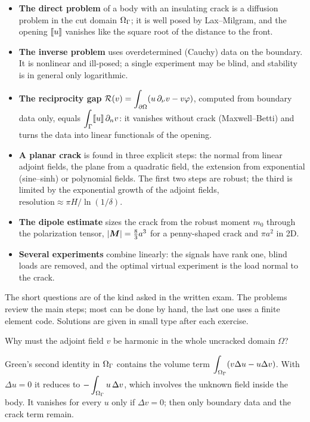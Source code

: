\begin{gbox*}
\begin{itemize}
  \item \textbf{The direct problem} of a body with an insulating crack is a
  diffusion problem in the cut domain $\Omega_\Gamma$; it is well posed by
  Lax--Milgram, and the opening $[\![u]\!]$ vanishes like the square root of the
  distance to the front.
  \item \textbf{The inverse problem} uses overdetermined (Cauchy) data on the
  boundary. It is nonlinear and ill-posed; a single experiment may be blind,
  and stability is in general only logarithmic.
  \item \textbf{The reciprocity gap} $\displaystyle \mathcal{R}(v)=\int_{\partial\Omega}(u\,\partial_\nu v-v\varphi)$,
  computed from boundary data only, equals $\displaystyle \int_\Gamma[\![u]\!]\,\partial_nv$:
  it vanishes without crack (Maxwell--Betti) and turns the data into linear
  functionals of the opening.
  \item \textbf{A planar crack} is found in three explicit steps: the normal
  from linear adjoint fields, the plane from a quadratic field, the extension
  from exponential (sine--sinh) or polynomial fields. The first two steps are
  robust; the third is limited by the exponential growth of the adjoint
  fields, $\text{resolution}\approx\pi H/\ln(1/\delta)$.
  \item \textbf{The dipole estimate} sizes the crack from the robust moment
  $m_0$ through the polarization tensor, $|\bm{M}|=\tfrac83a^3$ for a penny-shaped
  crack and $\pi a^2$ in 2D.
  \item \textbf{Several experiments} combine linearly: the signals have rank
  one, blind loads are removed, and the optimal virtual experiment is the
  load normal to the crack.
\end{itemize}
\end{gbox*}

\label{sec:rg-exo}
The short questions are of the kind asked in the written exam. The problems
review the main steps; most can be done by hand, the last one uses a finite
element code. Solutions are given in small type after each exercise.


\label{exo:rg-q-harmonic}
Why must the adjoint field $v$ be harmonic in the whole uncracked domain
$\Omega$?
\begin{solution}
Green's second identity in $\Omega_\Gamma$ contains the volume term
$\displaystyle \int_{\Omega_\Gamma}(v\Delta u-u\Delta v)$. With $\Delta u=0$ it reduces to
$\displaystyle -\int_{\Omega_\Gamma}u\,\Delta v$, which involves the unknown field inside the body.
It vanishes for every $u$ only if $\Delta v=0$; then only boundary data and
the crack term remain.
\end{solution}


